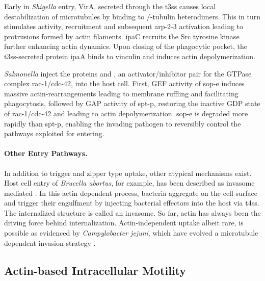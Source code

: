 
Early in \textit{Shigella} entry, VirA, secreted through the \gls{t3ss} causes local destabilization of microtubules by binding to \textalpha/\textbeta-tubulin heterodimers. This in turn stimulates  activity,  recruitment and subsequent \gls{arp-2-3} activation leading to protrusions formed by actin filaments. \Gls{ipa}C recruits the Src tyrosine kinase further enhancing actin dynamics. Upon closing of the phagocytic pocket, the \gls{t3ss}-secreted protein \gls{ipa}A binds to vinculin and induces actin depolymerization.


\textit{Salmonella} inject the proteins  and , an activator/inhibitor pair for the GTPase complex \gls{rac-1}/\gls{cdc-42}, into the host cell. First, GEF activity of \gls{sop-e} induces massive actin-rearrangements leading to membrane ruffling and facilitating phagocytosis, followed by GAP activity of \gls{spt-p}, restoring the inactive GDP state of \gls{rac-1}/\gls{cdc-42} and leading to actin depolymerization. \Gls{sop-e} is degraded more rapidly than \gls{spt-p}, enabling the invading pathogen to reversibly control the pathways exploited for entering.


\paragraph{Other Entry Pathways.}
In addition to trigger and zipper type uptake, other atypical mechanisms exist. Host cell entry of \textit{Brucella abortus}, for example, has been described as invasome mediated \citep{Dehio2005}. In this actin dependent process, bacteria aggregate on the cell surface and trigger their engulfment by injecting bacterial effectors into the host via \gls{t4ss}. The internalized structure is called an invasome. So far, actin has always been the driving force behind internalization. Actin-independent uptake albeit rare, is possible as evidenced by \textit{Campylobacter jejuni}, which have evolved a microtubule dependent invasion strategy \citep{Kopecko2001}.

\subsection{Actin-based Intracellular Motility}
\label{subsec:actin-motility}

